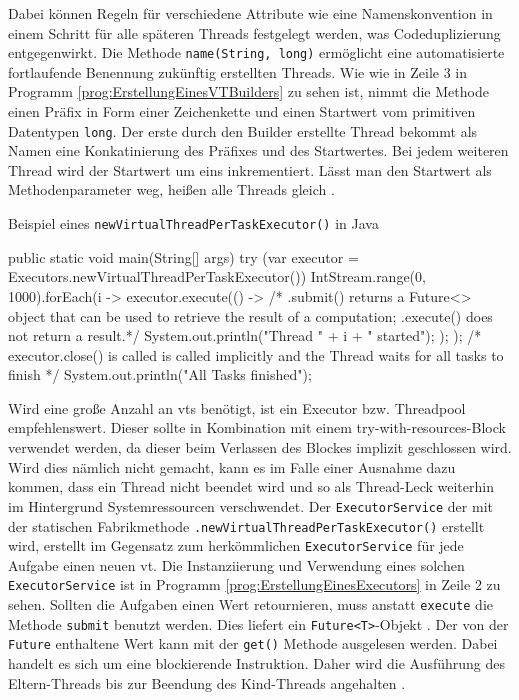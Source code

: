     Dabei können Regeln für verschiedene Attribute wie eine Namenskonvention
    in einem Schritt für alle späteren Threads festgelegt werden, was Codeduplizierung entgegenwirkt.
    Die Methode \texttt{name(String, long)} ermöglicht eine automatisierte fortlaufende Benennung zukünftig erstellten Threads. Wie wie in Zeile 3 in Programm 
    \ref{prog:ErstellungEinesVTBuilders} zu sehen ist, nimmt die Methode einen Präfix in Form einer Zeichenkette und einen Startwert vom primitiven
    Datentypen \texttt{long}. Der erste durch den Builder erstellte Thread bekommt als Namen eine Konkatinierung des Präfixes und des Startwertes. Bei jedem weiteren Thread wird der Startwert um eins inkrementiert. Lässt man den Startwert als Methodenparameter weg, heißen alle Threads gleich 
    \cite{oracle22Builder}. 

    \begin{program} [H]
        \caption{Beispiel eines \texttt{newVirtualThreadPerTaskExecutor()} in Java}
        \label{prog:ErstellungEinesExecutors}
    \begin{JavaCode}[language=Java, numbers=left]
public static void main(String[] args) {
    try (var executor = Executors.newVirtualThreadPerTaskExecutor()){
        IntStream.range(0, 1000).forEach(i -> {
            executor.execute(() -> {     
                /* .submit() returns a Future<> object that can be used to retrieve
                 the result of a computation; .execute() does not return a result.*/
                System.out.println("Thread " + i + " started");
            });
        });
    }       /* executor.close() is called is called implicitly and the Thread waits
             for all tasks to finish */
    System.out.println("All Tasks finished"); 
}\end{JavaCode}
    \end{program}

    Wird eine große Anzahl an \Glspl{vt} benötigt,  ist ein Executor bzw. Threadpool empfehlenswert. Dieser sollte in Kombination mit einem
    try-with-resources-Block verwendet werden, da dieser beim Verlassen des Blockes implizit geschlossen wird. Wird dies nämlich nicht gemacht, kann es
    im Falle einer Ausnahme dazu kommen, dass ein Thread nicht beendet wird und so als Thread-Leck weiterhin im Hintergrund Systemressourcen verschwendet.
    Der \texttt{ExecutorService} der mit der statischen Fabrikmethode \texttt{.newVirtualThreadPerTaskExecutor()} erstellt wird, 
    erstellt im Gegensatz zum herkömmlichen \texttt{ExecutorService} für jede Aufgabe einen neuen \gls{vt}. Die Instanziierung und Verwendung eines solchen \texttt{ExecutorService} 
    ist in Programm \ref{prog:ErstellungEinesExecutors} in Zeile 2 zu sehen.
    Sollten die Aufgaben einen Wert retournieren, muss anstatt \texttt{execute} die Methode \texttt{submit} benutzt werden. Dies liefert ein \texttt{Future<T>}-Objekt 
    \cite{oracle21VritualThreads}.
    Der von der \texttt{Future} enthaltene Wert kann mit der
    \texttt{get()}  Methode ausgelesen werden. Dabei handelt es sich um eine blockierende Instruktion. Daher wird die Ausführung des Eltern-Threads bis zur
    Beendung des Kind-Threads angehalten \cite{oracle21Future}.
    


